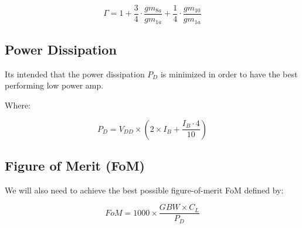 $$\Gamma = 1 + \frac{3}{4}\cdot \frac{gm_{8a}}{gm_{1a}} + \frac{1}{4}\cdot \frac{gm_{10}}{gm_{1a}}$$

\subsection{Power Dissipation}

Its intended that the power dissipation $P_D$ is minimized in order to have the best performing low power amp.

Where: 

$$P_D = V_{DD} \times \left(2 \times I_B + \dfrac{I_B\cdot 4}{10}\right) $$

\subsection{Figure of Merit (FoM)}
 We will also need to achieve the best possible figure-of-merit FoM defined by: 

$$FoM = 1000 \times \dfrac{GBW \times C_L}{P_D}$$
